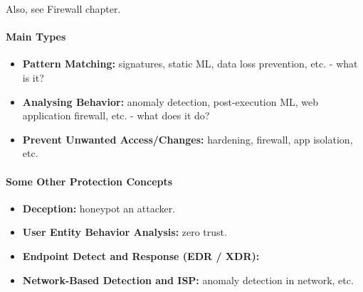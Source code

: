 Also, see Firewall chapter.

\paragraph{Main Types}
\begin{itemize}
    \item \textbf{Pattern Matching:} signatures, static ML, data loss prevention, etc. - what is it?
    \item \textbf{Analysing Behavior:} anomaly detection, post-execution ML, web application firewall, etc. - what does it do?
    \item \textbf{Prevent Unwanted Access/Changes:} hardening, firewall, app isolation, etc.
\end{itemize}

\paragraph{Some Other Protection Concepts}


\begin{itemize}
    \item \textbf{Deception:} honeypot an attacker.
    \item \textbf{User Entity Behavior Analysis:} zero trust.
    \item \textbf{Endpoint Detect and Response (EDR / XDR):} 
    \item \textbf{Network-Based Detection and ISP:} anomaly detection in network, etc.
\end{itemize}